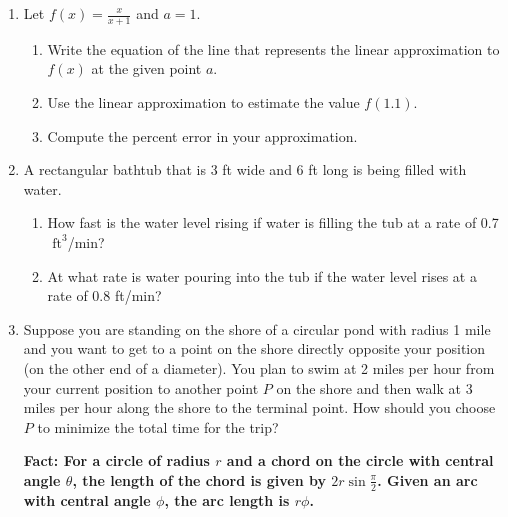 \documentclass[11pt,letterpaper]{article}
\begin{document}
\begin{enumerate}
\vspace{5pc}
\item Let $f(x)=\frac{x}{x+1}$ and $a=1$.

\begin{enumerate}
\item Write the equation of the line that represents the linear approximation to $f(x)$ at the given point $a$.

\vspace{10pc}
\item Use the linear approximation to estimate the value $f(1.1)$.

\vspace{10pc}
\item Compute the percent error in your approximation.

\end{enumerate}

\newpage
\item A rectangular bathtub that is 3 ft wide and 6 ft long is being filled with water.

\begin{enumerate}
\item How fast is the water level rising if water is filling the tub at a rate of 0.7$\text{ ft}^3$/min?

\vspace{20pc}
\item At what rate is water pouring into the tub if the water level rises at a rate of 0.8 ft/min?
\end{enumerate}

\newpage
\item Suppose you are standing on the shore of a circular pond with radius 1 mile and you want to get to a point on the shore directly opposite your position (on the other end of a diameter).  You plan to swim at 2 miles per hour from your current position to another point $P$ on the shore and then walk at 3 miles per hour along the shore to the terminal point.  How should you choose $P$ to minimize the total time for the trip?

{\bf Fact: For a circle of radius $r$ and a chord on the circle with central angle $\theta$, the length of the chord is given by $2r\sin\frac{\pi}{2}$.  Given an arc with central angle $\phi$, the arc length is $r\phi$. }

\end{enumerate}
\end{document}
